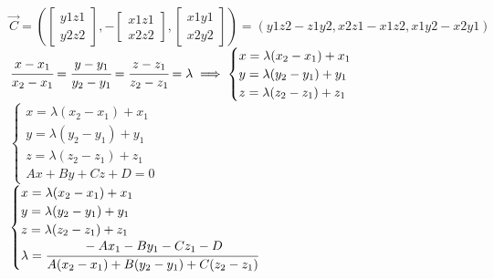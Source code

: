 \documentclass[12pt]{article} %
\begin{document}
    \hspace*{-2cm}$ \overrightarrow{C} = \left(\begin{bmatrix}
    y1 z1\\ y2 z2
    \end{bmatrix},-\begin{bmatrix}
    x1 z1\\ x2 z2
    \end{bmatrix},\begin{bmatrix}
    x1 y1\\ x2 y2
    \end{bmatrix}\right)= \left(y1z2 - z1y2, x2z1 - x1z2, x1y2 - x2y1\right)$\\
    $ \cfrac{x - x_1}{x_2 - x_1} = \cfrac{y - y_1}{y_2 - y_1} = \cfrac{z - z_1}{z_2 - z_1} = \lambda \implies \begin{cases}
    x = \lambda (x_2 - x_1) + x_1\\
    y = \lambda (y_2 - y_1) + y_1\\
    z = \lambda (z_2 - z_1) + z_1
    \end{cases}$\\ \newpage
	\hspace{-1cm}$\begin{cases}
	x = \lambda (x_2 - x_1) + x_1\\
	y = \lambda (y_2 - y_1) + y_1\\
	z = \lambda (z_2 - z_1) + z_1\\
	Ax + By + Cz + D = 0
	\end{cases}$\\
	$\begin{cases}
	x = \lambda (x_2 - x_1) + x_1\\
	y = \lambda (y_2 - y_1) + y_1\\
	z = \lambda (z_2 - z_1) + z_1\\
	\lambda = \cfrac{-Ax_1 - By_1 - Cz_1 - D}{A(x_2 - x_1) + B(y_2 - y_1) + C(z_2 - z_1)}
	\end{cases}$
 
\end{document}
